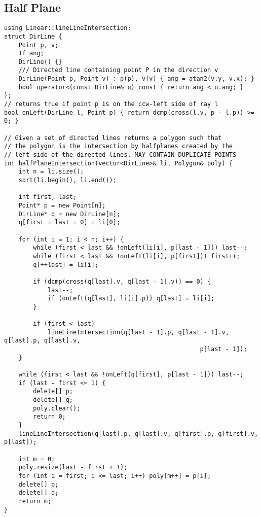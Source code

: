 \documentclass[FSZ,a4paper,onesided]{article}
\begin{document}
\begin{multicols*}{\COLS}
\subsection{Half Plane}
\begin{lstlisting}
using Linear::lineLineIntersection;
struct DirLine {
    Point p, v;
    Tf ang;
    DirLine() {}
    /// Directed line containing point P in the direction v
    DirLine(Point p, Point v) : p(p), v(v) { ang = atan2(v.y, v.x); }
    bool operator<(const DirLine& u) const { return ang < u.ang; }
};
// returns true if point p is on the ccw-left side of ray l
bool onLeft(DirLine l, Point p) { return dcmp(cross(l.v, p - l.p)) >= 0; }

// Given a set of directed lines returns a polygon such that
// the polygon is the intersection by halfplanes created by the
// left side of the directed lines. MAY CONTAIN DUPLICATE POINTS
int halfPlaneIntersection(vector<DirLine>& li, Polygon& poly) {
    int n = li.size();
    sort(li.begin(), li.end());

    int first, last;
    Point* p = new Point[n];
    DirLine* q = new DirLine[n];
    q[first = last = 0] = li[0];

    for (int i = 1; i < n; i++) {
        while (first < last && !onLeft(li[i], p[last - 1])) last--;
        while (first < last && !onLeft(li[i], p[first])) first++;
        q[++last] = li[i];

        if (dcmp(cross(q[last].v, q[last - 1].v)) == 0) {
            last--;
            if (onLeft(q[last], li[i].p)) q[last] = li[i];
        }

        if (first < last)
            lineLineIntersection(q[last - 1].p, q[last - 1].v, q[last].p, q[last].v,
                                                      p[last - 1]);
    }

    while (first < last && !onLeft(q[first], p[last - 1])) last--;
    if (last - first <= 1) {
        delete[] p;
        delete[] q;
        poly.clear();
        return 0;
    }
    lineLineIntersection(q[last].p, q[last].v, q[first].p, q[first].v, p[last]);

    int m = 0;
    poly.resize(last - first + 1);
    for (int i = first; i <= last; i++) poly[m++] = p[i];
    delete[] p;
    delete[] q;
    return m;
}
\end{lstlisting}
\end{multicols*}

\end{document}
